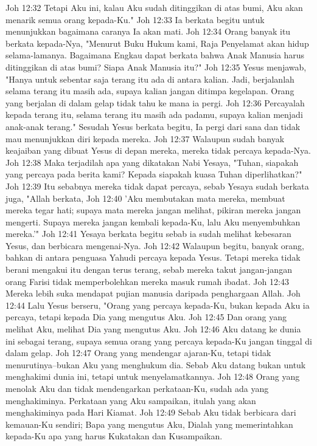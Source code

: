 Joh 12:32  Tetapi Aku ini, kalau Aku sudah ditinggikan di atas bumi, Aku akan menarik semua orang kepada-Ku."
Joh 12:33  Ia berkata begitu untuk menunjukkan bagaimana caranya Ia akan mati.
Joh 12:34  Orang banyak itu berkata kepada-Nya, "Menurut Buku Hukum kami, Raja Penyelamat akan hidup selama-lamanya. Bagaimana Engkau dapat berkata bahwa Anak Manusia harus ditinggikan di atas bumi? Siapa Anak Manusia itu?"
Joh 12:35  Yesus menjawab, "Hanya untuk sebentar saja terang itu ada di antara kalian. Jadi, berjalanlah selama terang itu masih ada, supaya kalian jangan ditimpa kegelapan. Orang yang berjalan di dalam gelap tidak tahu ke mana ia pergi.
Joh 12:36  Percayalah kepada terang itu, selama terang itu masih ada padamu, supaya kalian menjadi anak-anak terang." Sesudah Yesus berkata begitu, Ia pergi dari sana dan tidak mau menunjukkan diri kepada mereka.
Joh 12:37  Walaupun sudah banyak keajaiban yang dibuat Yesus di depan mereka, mereka tidak percaya kepada-Nya.
Joh 12:38  Maka terjadilah apa yang dikatakan Nabi Yesaya, "Tuhan, siapakah yang percaya pada berita kami? Kepada siapakah kuasa Tuhan diperlihatkan?"
Joh 12:39  Itu sebabnya mereka tidak dapat percaya, sebab Yesaya sudah berkata juga, "Allah berkata,
Joh 12:40  'Aku membutakan mata mereka, membuat mereka tegar hati; supaya mata mereka jangan melihat, pikiran mereka jangan mengerti. Supaya mereka jangan kembali kepada-Ku, lalu Aku menyembuhkan mereka.'"
Joh 12:41  Yesaya berkata begitu sebab ia sudah melihat kebesaran Yesus, dan berbicara mengenai-Nya.
Joh 12:42  Walaupun begitu, banyak orang, bahkan di antara penguasa Yahudi percaya kepada Yesus. Tetapi mereka tidak berani mengakui itu dengan terus terang, sebab mereka takut jangan-jangan orang Farisi tidak memperbolehkan mereka masuk rumah ibadat.
Joh 12:43  Mereka lebih suka mendapat pujian manusia daripada penghargaan Allah.
Joh 12:44  Lalu Yesus berseru, "Orang yang percaya kepada-Ku, bukan kepada Aku ia percaya, tetapi kepada Dia yang mengutus Aku.
Joh 12:45  Dan orang yang melihat Aku, melihat Dia yang mengutus Aku.
Joh 12:46  Aku datang ke dunia ini sebagai terang, supaya semua orang yang percaya kepada-Ku jangan tinggal di dalam gelap.
Joh 12:47  Orang yang mendengar ajaran-Ku, tetapi tidak menurutinya--bukan Aku yang menghukum dia. Sebab Aku datang bukan untuk menghakimi dunia ini, tetapi untuk menyelamatkannya.
Joh 12:48  Orang yang menolak Aku dan tidak mendengarkan perkataan-Ku, sudah ada yang menghakiminya. Perkataan yang Aku sampaikan, itulah yang akan menghakiminya pada Hari Kiamat.
Joh 12:49  Sebab Aku tidak berbicara dari kemauan-Ku sendiri; Bapa yang mengutus Aku, Dialah yang memerintahkan kepada-Ku apa yang harus Kukatakan dan Kusampaikan.
